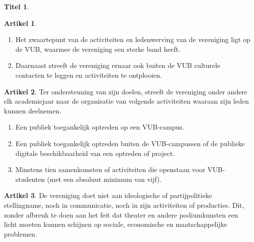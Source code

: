 \documentclass[a4paper,10pt]{article}
\theoremstyle{definition}
\newtheorem{titel}{\newline\Large Titel}
\newtheorem{artikelbase}{\large Artikel}
\newenvironment{artikel}
  {\begin{artikelbase}}
  {\smallskip
   \end{artikelbase}}
\newcommand{\ttextcr}{\hfill\newline}
\newcommand{\ttextenum}{\mbox{}}
\begin{document}
\begin{titel}
  \begin{artikel}\ttextenum
    \begin{enumerate}
      \item
        Het zwaartepunt van de activiteiten en ledenwerving van de vereniging ligt op de VUB, waarmee de vereniging een sterke band heeft.
      \item
        Daarnaast streeft de vereniging ernaar ook buiten de VUB culturele contacten te leggen en activiteiten te ontplooien.
    \end{enumerate}
  \end{artikel}

  \begin{artikel}\ttextcr
    Ter ondersteuning van zijn doelen, streeft de vereniging onder andere elk academiejaar naar de organisatie van volgende activiteiten waaraan zijn leden kunnen deelnemen.
    \begin{enumerate}
      \item Een publiek toegankelijk optreden op een VUB-campus.
      \item Een publiek toegankelijk optreden buiten de VUB-campussen of de publieke digitale beschikbaarheid van een optreden of project.
      \item Minstens tien samenkomsten of activiteiten die openstaan voor VUB-studenten (met een absoluut minimum van vijf).
    \end{enumerate}
  \end{artikel}

  \begin{artikel}\ttextcr
    De vereniging doet niet aan ideologische of partijpolitieke stellingname, noch in communicatie, noch in zijn activiteiten of producties.
    Dit, zonder afbreuk te doen aan het feit dat theater en andere podiumkunsten een licht moeten kunnen schijnen op sociale, economische en maatschappelijke problemen.
  \end{artikel}

\end{titel}

\end{document}
